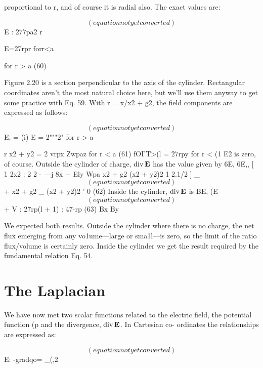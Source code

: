 proportional to r, and of course it is radial also. The exact values
are:

\begin{equation}
(equation not yet converted)
\end{equation}
E : 277pa2
r

E=27rpr forr<a

for r > a
(60)

Figure 2.20 is a section perpendicular to the axis of the cylinder.
Rectangular coordinates aren't the most natural choice here, but
we'll use them anyway to get some practice with Eq. 59. With
r = x/x2 + g2, the field components are expressed as follows:

\begin{equation}
(equation not yet converted)
\end{equation}
E, = (i) E = 2"""2" for r > a

r x2 + y2
= 2
vrpx Zwpaz for r < a (61)
 fOI'T>(l
= 27rpy for r < (1
E2 is zero, of course.
Outside the cylinder of charge, $\operatorname{div}\mathbf{E}$ has the value given by
6E, 6E,, [ 1 2x2
: 2 2 - ---j
8x + Ely Wpa x2 + g2 (x2 + y2)2
1 2.1/2 ] _
\begin{equation}
(equation not yet converted)
\end{equation}
+ x2 + g2 _ (x2 + y2)2 ' 0 (62)
Inside the cylinder, $\operatorname{div}\mathbf{E}$ is
BE, (E
\begin{equation}
(equation not yet converted)
\end{equation}
+ V : 27rp(l + 1) : 47-rp (63)
Bx By

We expected both results. Outside the cylinder where there is no
charge, the net flux emerging from any vo1ume---large or sma1l---is
zero, so the limit of the ratio flux/volume is certainly zero. Inside the
cylinder we get the result required by the fundamental relation Eq. 54.

\section{The Laplacian}

We have now met two scalar functions related to the electric field,
the potential function (p and the divergence, $\operatorname{div}\mathbf{E}$. In Cartesian co-
ordinates the relationships are expressed as:

\begin{equation}
(equation not yet converted)
\end{equation}
E: -gradqo= _(,2%

